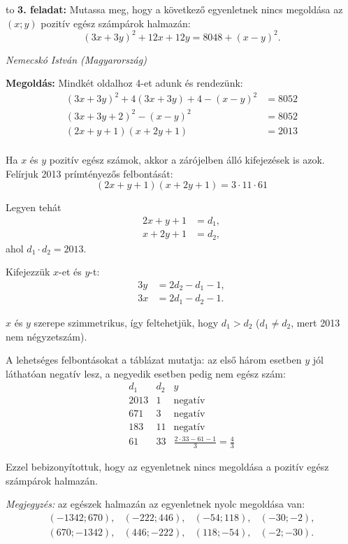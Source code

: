 \documentclass[a4paper,10pt]{article}
\newcommand{\ki}[2]{\hfill {\it #1 (#2)}\medskip}
\newcommand{\vonal}{\hbox to \hsize{\hskip2truecm\hrulefill\hskip2truecm}}
\begin{document}
\medskip

\vonal
{\bf 3. feladat: } Mutassa meg, hogy a következő egyenletnek nincs megoldása az $(x; y)$ pozitív egész számpárok halmazán:
\[(3x+3y)^2+12x+12y=8048+(x-y)^2.\]

\ki{Nemecskó István}{Magyarország}\medskip

{\bf Megoldás: } Mindkét oldalhoz 4-et adunk és rendezünk:
\begin{align*}
(3x+3y)^2+4(3x+3y)+4-(x-y)^2&=8052\\
(3x+3y+2)^2-(x-y)^2&=8052\\
(2x+y+1)(x+2y+1)&=2013\\
\end{align*}

Ha $x$ és $y$ pozitív egész számok, akkor a zárójelben álló kifejezések is azok. Felírjuk 2013 prímtényezős felbontását:
\[(2x+y+1)(x+2y+1)=3\cdot11\cdot61\]

Legyen tehát
\begin{align*}
2x+y+1&=d_1,\\
x+2y+1&=d_2,
\end{align*}
ahol $d_1\cdot d_2=2013$.

Kifejezzük $x$-et és $y$-t:
\begin{align*}
3y&=2d_2-d_1-1,\\
3x&=2d_1-d_2-1.
\end{align*}

$x$ és $y$ szerepe szimmetrikus, így feltehetjük, hogy $d_1>d_2$ ($d_1\ne d_2$, mert 2013 nem négyzetszám).

A lehetséges felbontásokat a táblázat mutatja: az első három esetben $y$ jól láthatóan negatív lesz, a negyedik esetben pedig nem egész szám:
\[
\begin{array}{ccc}
d_1 & d_2 & y\\
\hline
2013 & 1 & \textrm{negatív}\\
671 & 3 & \textrm{negatív}\\
183 & 11 & \textrm{negatív}\\
61 & 33 & \frac{2\cdot33-61-1}{3}=\frac43 
\end{array}
\]

Ezzel bebizonyítottuk, hogy az egyenletnek nincs megoldása a pozitív egész számpárok halmazán.

{\it Megjegyzés: } az egészek halmazán az egyenletnek nyolc megoldása van:
\[\begin{array}{cccc}
(-1342; 670), &(-222; 446), &(-54; 118), &(-30; -2),\\
(670; -1342), &(446; -222), &(118; -54), &(-2; -30).
\end{array}\]
\end{document}
